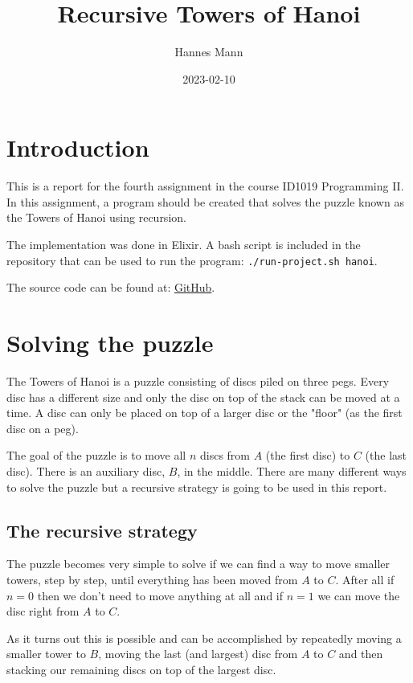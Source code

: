 \documentclass[a4paper,11pt]{article}
\begin{document}
\title{
    \textbf{Recursive Towers of Hanoi}
}
\author{Hannes Mann}
\date{2023-02-10}

\maketitle

\section*{Introduction}

This is a report for the fourth assignment in the course ID1019 Programming II.
In this assignment, a program should be created that solves the puzzle known as the Towers of Hanoi using recursion.

The implementation was done in Elixir. A bash script is included in the repository that can be used to run the program: \texttt{./run-project.sh hanoi}.

The source code can be found at: \href{https://github.com/hannesmann/ID1019/tree/main/src/hanoi}{GitHub}.

\section*{Solving the puzzle}

The Towers of Hanoi is a puzzle consisting of discs piled on three pegs.
Every disc has a different size and only the disc on top of the stack can be moved at a time.
A disc can only be placed on top of a larger disc or the "floor" (as the first disc on a peg).

The goal of the puzzle is to move all $n$ discs from $A$ (the first disc) to $C$ (the last disc). There is an auxiliary disc, $B$, in the middle.
There are many different ways to solve the puzzle but a recursive strategy is going to be used in this report.

\subsection*{The recursive strategy}

The puzzle becomes very simple to solve if we can find a way to move smaller towers, step by step, until everything has been moved from $A$ to $C$.
After all if $n=0$ then we don't need to move anything at all and if $n=1$ we can move the disc right from $A$ to $C$.

As it turns out this is possible and can be accomplished by repeatedly moving a smaller tower to $B$,
moving the last (and largest) disc from $A$ to $C$ and then stacking our remaining discs on top of the largest disc.
\end{document}
